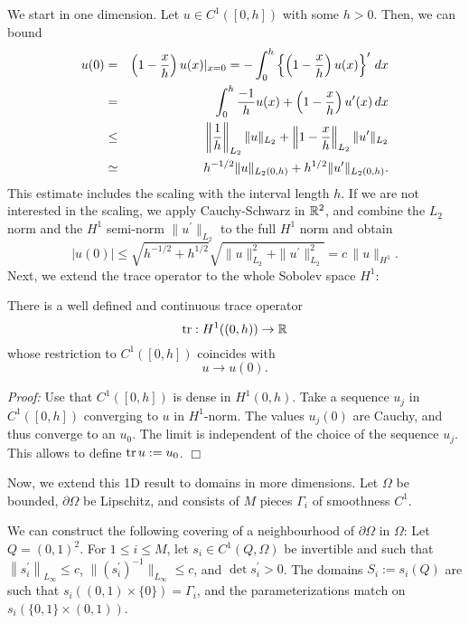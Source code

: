 We start in one dimension. Let $u \in C^1 ([0,h])$ with some $h > 0$. Then,
we can bound 
\begin{eqnarray*}
u(0) & = & \left(1 - \frac{x}{h} \right) u(x) |_{x=0} = 
        - \int_0^h \left\{ \left(1-\frac{x}{h} \right) u(x) \right\}^\prime \, dx \\
        & = & \int_0^h  \frac{-1}{h} u(x) + \left(1-\frac{x}{h} \right) u^\prime(x)  \, dx \\
        & \leq & \left\| \frac{1}{h} \right\|_{L_2} \| u \|_{L_2} + 
                \left\| 1-\frac{x}{h} \right\|_{L_2} \| u^\prime \|_{L_2} \\
        & \simeq & h^{-1/2} \| u \|_{L_2(0,h)} + h^{1/2} \| u^\prime \|_{L_2(0,h)}.
\end{eqnarray*}
This estimate includes the scaling with the interval length $h$. 
If we are not interested in the scaling, we apply Cauchy-Schwarz in ${\mathbb R}^2$,
and combine the $L_2$ norm and the $H^1$ semi-norm $\|u^\prime\|_{L_2}$ to the full $H^1$ norm and obtain
$$
|u(0)| \leq \sqrt{h^{-1/2} + h^{1/2} } \sqrt{ \| u \|_{L_2}^2 + \| u^\prime \|_{L_2}^2 } = c \, \| u \|_{H^1}.
$$
Next, we extend the trace operator to the whole Sobolev space $H^1$:
\begin{theorem} There is a well defined and continuous trace operator
$$
\operatorname{tr} : H^1((0,h)) \rightarrow {\mathbb R}
$$
whose restriction to $C^1([0,h])$ coincides with
$$
u \rightarrow u(0).
$$
\end{theorem}
{\em Proof:} Use that $C^1([0,h])$ is dense in $H^1(0,h)$. Take a sequence
$u_j$ in $C^1([0,h])$ converging to $u$ in $H^1$-norm. The values 
$u_j(0)$ are Cauchy, and thus converge to an $u_0$. The limit is independent 
of the choice of the sequence $u_j$. This allows to define $\operatorname{tr} u := u_0$.
\hfill $\Box$

\medskip

Now, we extend this 1D result to domains in more dimensions. Let
$\Omega$ be bounded, $\partial \Omega$ be Lipschitz, and consists of
$M$ pieces $\Gamma_i$ of smoothness $C^1$. 

We can construct the following covering of a neighbourhood of 
$\partial \Omega$ in $\Omega$: Let $Q = (0,1)^2$. For $1 \leq i \leq M$, 
let $s_i \in C^1 (Q, \Omega)$ be invertible and such that $\left\| s_i^\prime \right\|_{L_\infty} \leq c$,
 $\| (s_i^\prime)^{-1} \|_{L_\infty} \leq c$, and $\operatorname{det} s_i^\prime > 0$. The domains $S_i := s_i(Q)$ are
such that $s_i( (0,1) \times \{ 0 \} ) = \Gamma_i$, and the parameterizations
match on $s_i( \{ 0,1 \} \times (0,1) )$.


